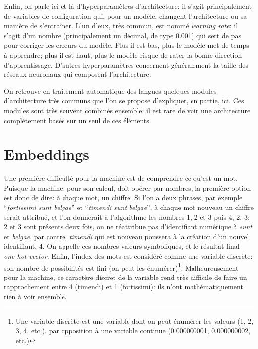 Enfin, on parle ici et là d'hyperparamètres d'architecture: il s'agit principalement de variables de configuration qui, pour un modèle, changent l'architecture ou sa manière de s'entraîner. L'un d'eux, très commun, est nommé \textit{learning rate}: il s'agit d'un nombre (principalement un décimal, de type 0.001) qui sert de pas pour corriger les erreurs du modèle. Plus il est bas, plus le modèle met de temps à apprendre; plus il est haut, plus le modèle risque de rater la bonne direction d'apprentissage. D'autres hyperparamètres concernent généralement la taille des réseaux neuronaux qui composent l'architecture. 

On retrouve en traitement automatique des langues quelques modules d'architecture très communs que l'on se propose d'expliquer, en partie, ici. Ces modules sont très souvent combinés ensemble: il est rare de voir une architecture complètement basée sur un seul de ces éléments.

\section{Embeddings}
\label{deep-learning:embeddings}

Une première difficulté pour la machine est de comprendre ce qu'est un mot. Puisque la machine, pour son calcul, doit opérer par nombres, la première option est donc de dire: à chaque mot, un chiffre. Si l'on a deux phrases, par exemple \enquote{\textit{fortissimi sunt belgae}} et \enquote{\textit{timendi sunt belgae}}, à chaque mot nouveau un chiffre serait attribué, et l'on donnerait à l'algorithme les nombres 1, 2 et 3 puis 4, 2, 3: 2 et 3 sont présents deux fois, on ne réattribue pas d'identifiant numérique à \textit{sunt} et \textit{belgae}, par contre, \textit{timendi} qui est nouveau poussera à la création d'un nouvel identifiant, 4. On appelle ces nombres valeurs symboliques, et le résultat final \textit{one-hot vector}. Enfin, l'index des mots est considéré comme une variable discrète: son nombre de possibilités est fini (on peut les énumérer)\footnote{Une variable discrète est une variable dont on peut énumérer les valeurs (1, 2, 3, 4, etc.). par opposition à une variable continue (0.000000001, 0.000000002, etc.)}. Malheureusement pour la machine, ce caractère discret de la variable rend très difficile de faire un rapprochement entre 4 (timendi) et 1 (fortissimi): ils n'ont mathématiquement rien à voir ensemble. 

